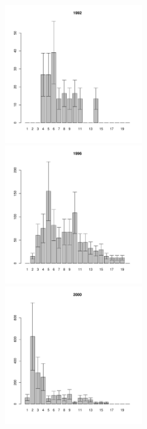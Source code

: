 \documentclass[12pt, a4paper]{article}
\begin{document}
\begin{figure}[h]

\begin{multicols}{3}
\hfill
\includegraphics[width=60mm]{../White_Sea/Luvenga_II_razrez/fucus_zone_1992_.pdf}
\hfill
\includegraphics[width=60mm]{../White_Sea/Luvenga_II_razrez/fucus_zone_1996_.pdf}
\hfill
\includegraphics[width=60mm]{../White_Sea/Luvenga_II_razrez/fucus_zone_2000_.pdf}
\end{multicols}




\end{figure}
\end{document}
